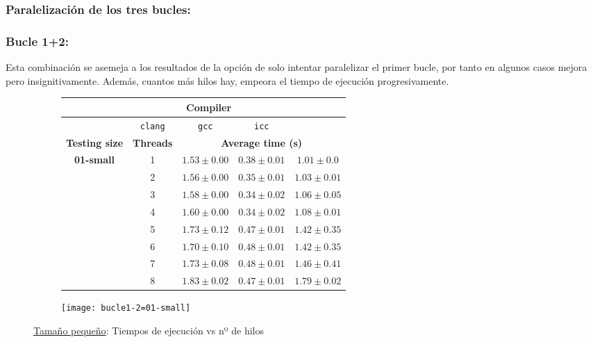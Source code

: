 
\subsubsection{\textbf{Paralelización de los tres bucles:}}
\subsubsection{\textbf{Bucle 1+2:}}
\par Esta combinación se asemeja a los resultados de la opción de solo intentar paralelizar el primer 
bucle, por tanto en algunos casos mejora pero insignitivamente. Además, cuantos más hilos hay, empeora 
el tiempo de ejecución progresivamente.
\begin{figure}[H]
    \centering
    \begin{subfigure}{0.4\textwidth}
        \begin{adjustbox}{width=\textwidth} 
        \begin{tabular}{|c|c|c|c|c|}
            \hline
            \rowcolor{azul} \multicolumn{2}{|c|}{}&\multicolumn{3}{c|}{\textbf{Compiler}} \\ \hline
            \rowcolor{azul} \multicolumn{2}{|c|}{}&\texttt{clang}&\texttt{gcc}&\texttt{icc}\\ \hline
            \rowcolor{azul} \textbf{Testing size} & \textbf{Threads}&\multicolumn{3}{c|}{\textbf{Average time (s)}} \\ \hline
            \multirow{8}{1cm}{\textbf{01-small}} & 1 & \(1.53\pm{0.00}\) & \(0.38\pm{0.01}\) & \(1.01\pm{0.0}\) \\ \cline{2-5}
            & 2 & \(1.56\pm{0.00}\) & \(0.35\pm{0.01}\) & \(1.03\pm{0.01}\) \\ \cline{2-5}
            & 3 & \(1.58\pm{0.00}\) & \(0.34\pm{0.02}\) & \(1.06\pm{0.05}\) \\ \cline{2-5}
            & 4 & \(1.60\pm{0.00}\) & \(0.34\pm{0.02}\) & \(1.08\pm{0.01}\) \\ \cline{2-5}
            & 5 & \(1.73\pm{0.12}\) & \(0.47\pm{0.01}\) & \(1.42\pm{0.35}\) \\ \cline{2-5}
            & 6 & \(1.70\pm{0.10}\) & \(0.48\pm{0.01}\) & \(1.42\pm{0.35}\) \\ \cline{2-5}
            & 7 & \(1.73\pm{0.08}\) & \(0.48\pm{0.01}\) & \(1.46\pm{0.41}\) \\ \cline{2-5}
            & 8 & \(1.83\pm{0.02}\) & \(0.47\pm{0.01}\) & \(1.79\pm{0.02}\) \\ \hline
        \end{tabular}
        \end{adjustbox}
    \end{subfigure}
    \hfill
    \begin{subfigure}{0.5\textwidth}
        \texttt{[image: bucle1-2=01-small]}
    \end{subfigure}
    \caption{\underline{Tamaño pequeño}: Tiempos de ejecución vs nº de hilos}
    \label{fig:bucle1-2=01-small}
\end{figure}

